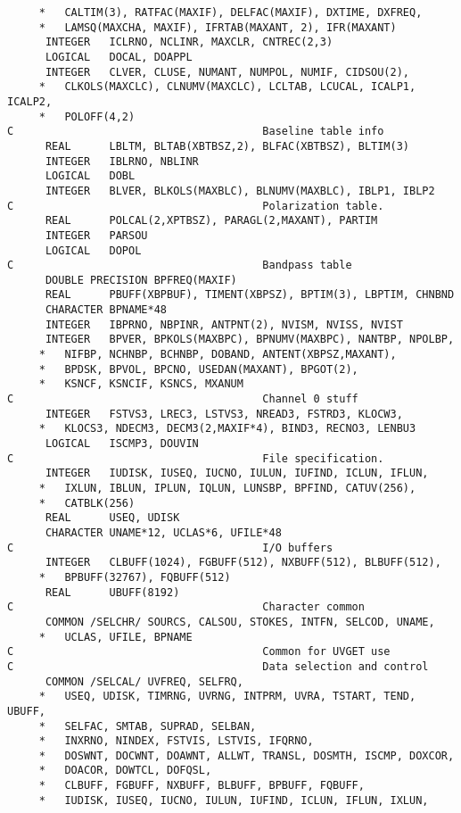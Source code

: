 \begin{verbatim}
     *   CALTIM(3), RATFAC(MAXIF), DELFAC(MAXIF), DXTIME, DXFREQ,
     *   LAMSQ(MAXCHA, MAXIF), IFRTAB(MAXANT, 2), IFR(MAXANT)
      INTEGER   ICLRNO, NCLINR, MAXCLR, CNTREC(2,3)
      LOGICAL   DOCAL, DOAPPL
      INTEGER   CLVER, CLUSE, NUMANT, NUMPOL, NUMIF, CIDSOU(2),
     *   CLKOLS(MAXCLC), CLNUMV(MAXCLC), LCLTAB, LCUCAL, ICALP1, ICALP2,
     *   POLOFF(4,2)
C                                       Baseline table info
      REAL      LBLTM, BLTAB(XBTBSZ,2), BLFAC(XBTBSZ), BLTIM(3)
      INTEGER   IBLRNO, NBLINR
      LOGICAL   DOBL
      INTEGER   BLVER, BLKOLS(MAXBLC), BLNUMV(MAXBLC), IBLP1, IBLP2
C                                       Polarization table.
      REAL      POLCAL(2,XPTBSZ), PARAGL(2,MAXANT), PARTIM
      INTEGER   PARSOU
      LOGICAL   DOPOL
C                                       Bandpass table
      DOUBLE PRECISION BPFREQ(MAXIF)
      REAL      PBUFF(XBPBUF), TIMENT(XBPSZ), BPTIM(3), LBPTIM, CHNBND
      CHARACTER BPNAME*48
      INTEGER   IBPRNO, NBPINR, ANTPNT(2), NVISM, NVISS, NVIST
      INTEGER   BPVER, BPKOLS(MAXBPC), BPNUMV(MAXBPC), NANTBP, NPOLBP,
     *   NIFBP, NCHNBP, BCHNBP, DOBAND, ANTENT(XBPSZ,MAXANT),
     *   BPDSK, BPVOL, BPCNO, USEDAN(MAXANT), BPGOT(2),
     *   KSNCF, KSNCIF, KSNCS, MXANUM
C                                       Channel 0 stuff
      INTEGER   FSTVS3, LREC3, LSTVS3, NREAD3, FSTRD3, KLOCW3,
     *   KLOCS3, NDECM3, DECM3(2,MAXIF*4), BIND3, RECNO3, LENBU3
      LOGICAL   ISCMP3, DOUVIN
C                                       File specification.
      INTEGER   IUDISK, IUSEQ, IUCNO, IULUN, IUFIND, ICLUN, IFLUN,
     *   IXLUN, IBLUN, IPLUN, IQLUN, LUNSBP, BPFIND, CATUV(256),
     *   CATBLK(256)
      REAL      USEQ, UDISK
      CHARACTER UNAME*12, UCLAS*6, UFILE*48
C                                       I/O buffers
      INTEGER   CLBUFF(1024), FGBUFF(512), NXBUFF(512), BLBUFF(512),
     *   BPBUFF(32767), FQBUFF(512)
      REAL      UBUFF(8192)
C                                       Character common
      COMMON /SELCHR/ SOURCS, CALSOU, STOKES, INTFN, SELCOD, UNAME,
     *   UCLAS, UFILE, BPNAME
C                                       Common for UVGET use
C                                       Data selection and control
      COMMON /SELCAL/ UVFREQ, SELFRQ,
     *   USEQ, UDISK, TIMRNG, UVRNG, INTPRM, UVRA, TSTART, TEND, UBUFF,
     *   SELFAC, SMTAB, SUPRAD, SELBAN,
     *   INXRNO, NINDEX, FSTVIS, LSTVIS, IFQRNO,
     *   DOSWNT, DOCWNT, DOAWNT, ALLWT, TRANSL, DOSMTH, ISCMP, DOXCOR,
     *   DOACOR, DOWTCL, DOFQSL,
     *   CLBUFF, FGBUFF, NXBUFF, BLBUFF, BPBUFF, FQBUFF,
     *   IUDISK, IUSEQ, IUCNO, IULUN, IUFIND, ICLUN, IFLUN, IXLUN,

\end{verbatim}
